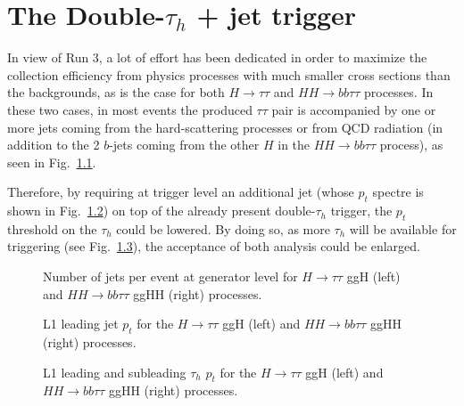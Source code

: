 \documentclass[../main.tex]{subfiles}
\begin{document}
\chapter{The Double-$\tau_h$ + jet trigger}

In view of Run 3, a lot of effort has been dedicated in order to maximize the collection efficiency from physics processes with much smaller cross sections than the backgrounds, as is the case for both $H\to\tau\tau$ and $HH\to bb\tau\tau$ processes. In these two cases, in most events the produced $\tau\tau$ pair is accompanied by one or more jets coming from the hard-scattering processes or from QCD radiation (in addition to the 2 $b$-jets coming from the other $H$ in the $HH\to bb\tau\tau$ process), as seen in Fig.~\ref{hh:fig:trig_ngenjets}. 


Therefore, by requiring at trigger level an additional jet (whose $p_t$ spectre is shown in Fig.~\ref{hh:fig:trig_l1jet_pt}) on top of the already present double-$\tau_h$ trigger, the $p_t$ threshold on the $\tau_h$ could be lowered. By doing so, as more $\tau_h$ will be available for triggering (see Fig.~\ref{hh:fig:trig_l1tau_pt}), the acceptance of both analysis could be enlarged.


\begin{figure}[h!]
\begin{center}
\end{center}
\caption{Number of jets  per event at generator level for $H\to\tau\tau$ ggH (left) and $HH\to bb\tau\tau$ ggHH (right) processes.}
\label{hh:fig:trig_ngenjets}
\end{figure}

\begin{figure}[h!]
\begin{center}
\end{center}
\caption{L1 leading jet $p_t$ for the $H\to\tau\tau$ ggH (left) and $HH\to bb\tau\tau$ ggHH (right) processes.}
\label{hh:fig:trig_l1jet_pt}
\end{figure}

\begin{figure}[h!]
\begin{center}
\end{center}
\caption{L1 leading and subleading $\tau_h$ $p_t$ for the $H\to\tau\tau$ ggH (left) and $HH\to bb\tau\tau$ ggHH (right) processes.}
\label{hh:fig:trig_l1tau_pt}
\end{figure}
\end{document}

